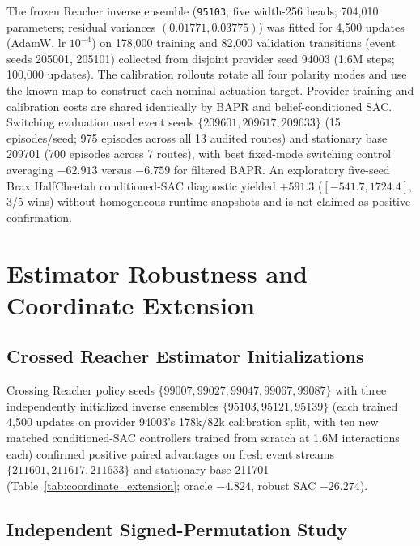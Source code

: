 The frozen Reacher inverse ensemble (\texttt{95103}; five width-256 heads; 704,010 parameters; residual variances $(0.01771,0.03775)$) was fitted for 4,500 updates (AdamW, lr $10^{-4}$) on 178,000 training and 82,000 validation transitions (event seeds 205001, 205101) collected from disjoint provider seed 94003 (1.6M steps; 100,000 updates). The calibration rollouts rotate all four polarity modes and use the known map to construct each nominal actuation target. Provider training and calibration costs are shared identically by BAPR and belief-conditioned SAC. Switching evaluation used event seeds $\{209601,209617,209633\}$ (15 episodes/seed; 975 episodes across all 13 audited routes) and stationary base 209701 (700 episodes across 7 routes), with best fixed-mode switching control averaging $-62.913$ versus $-6.759$ for filtered BAPR. An exploratory five-seed Brax HalfCheetah conditioned-SAC diagnostic yielded $+591.3$ ($[-541.7,1724.4]$, 3/5 wins) without homogeneous runtime snapshots and is not claimed as positive confirmation.

\section{Estimator Robustness and Coordinate Extension}
\label{app:coordinate_extension}

\subsection{Crossed Reacher Estimator Initializations}

Crossing Reacher policy seeds $\{99007,99027,99047,99067,99087\}$ with three independently initialized inverse ensembles $\{95103,95121,95139\}$ (each trained 4,500 updates on provider 94003's 178k/82k calibration split, with ten new matched conditioned-SAC controllers trained from scratch at 1.6M interactions each) confirmed positive paired advantages on fresh event streams $\{211601,211617,211633\}$ and stationary base 211701 (Table~\ref{tab:coordinate_extension}; oracle $-4.824$, robust SAC $-26.274$).

\subsection{Independent Signed-Permutation Study}

